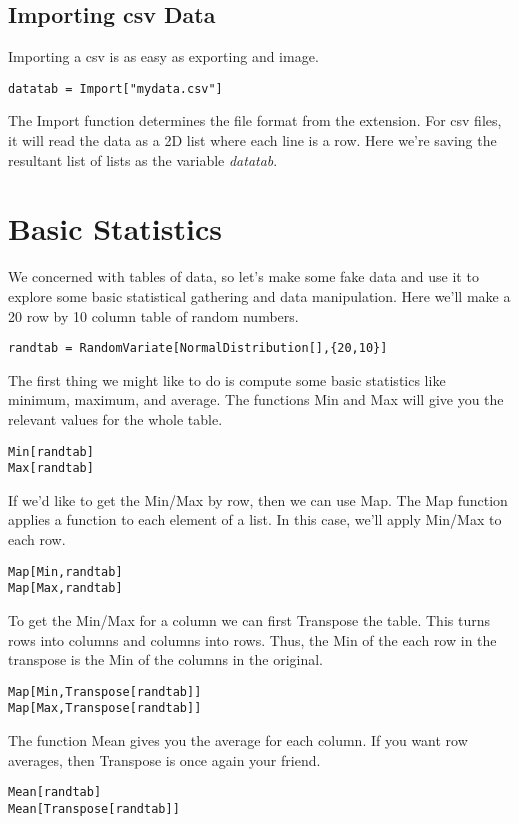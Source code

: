 \documentclass[]{tufte-handout}
\begin{document}
\subsection{Importing csv Data}

Importing a csv is as easy as exporting and image.  
\begin{verbatim}
datatab = Import["mydata.csv"]
\end{verbatim}
The Import function determines the file format from the extension. For csv files, it will read the data as a 2D list where each line is a row. Here we're saving the resultant list of lists as the variable \textit{datatab}. 

\section{Basic Statistics} 


We concerned with tables of data, so let's make some fake data and use it to explore some basic statistical gathering and data manipulation. Here we'll make a 20 row by 10 column table of random numbers. 
\begin{verbatim}
randtab = RandomVariate[NormalDistribution[],{20,10}]
\end{verbatim}

The first thing we might like to do is compute some basic statistics like minimum, maximum, and average. The functions Min and Max will give you the relevant values for the whole table. 
\begin{verbatim}
Min[randtab]
Max[randtab]
\end{verbatim}
If we'd like to get the Min/Max by row, then we can use Map. The Map function applies a function to each element of a list. In this case, we'll apply Min/Max to each row.
\begin{verbatim}
Map[Min,randtab]
Map[Max,randtab]
\end{verbatim}
To get the Min/Max for a column we can first Transpose the table. This turns rows into columns and columns into rows. Thus, the Min of the each row in the transpose is the Min of the columns in the original.
\begin{verbatim}
Map[Min,Transpose[randtab]]
Map[Max,Transpose[randtab]]
\end{verbatim}

The function Mean gives you the average for each column.  If you want row averages, then Transpose is once again your friend.
\begin{verbatim}
Mean[randtab]
Mean[Transpose[randtab]]
\end{verbatim}
\end{document}

